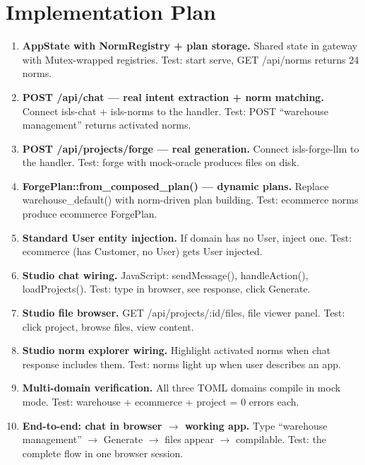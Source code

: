 \documentclass[11pt,a4paper]{article}
\begin{document}
\section{Implementation Plan}

\begin{enumerate}
\item \textbf{AppState with NormRegistry + plan storage.}
  Shared state in gateway with Mutex-wrapped registries.
  Test: start serve, GET /api/norms returns 24 norms.

\item \textbf{POST /api/chat --- real intent extraction + norm matching.}
  Connect isls-chat + isls-norms to the handler.
  Test: POST ``warehouse management'' returns activated norms.

\item \textbf{POST /api/projects/forge --- real generation.}
  Connect isls-forge-llm to the handler.
  Test: forge with mock-oracle produces files on disk.

\item \textbf{ForgePlan::from\_composed\_plan() --- dynamic plans.}
  Replace warehouse\_default() with norm-driven plan building.
  Test: ecommerce norms produce ecommerce ForgePlan.

\item \textbf{Standard User entity injection.}
  If domain has no User, inject one.
  Test: ecommerce (has Customer, no User) gets User injected.

\item \textbf{Studio chat wiring.}
  JavaScript: sendMessage(), handleAction(), loadProjects().
  Test: type in browser, see response, click Generate.

\item \textbf{Studio file browser.}
  GET /api/projects/:id/files, file viewer panel.
  Test: click project, browse files, view content.

\item \textbf{Studio norm explorer wiring.}
  Highlight activated norms when chat response includes them.
  Test: norms light up when user describes an app.

\item \textbf{Multi-domain verification.}
  All three TOML domains compile in mock mode.
  Test: warehouse + ecommerce + project = 0 errors each.

\item \textbf{End-to-end: chat in browser $\to$ working app.}
  Type ``warehouse management'' $\to$ Generate $\to$ files appear $\to$ compilable.
  Test: the complete flow in one browser session.
\end{enumerate}
\end{document}
